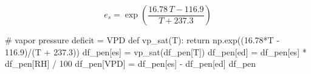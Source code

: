 \documentclass[
  letterpaper,
  DIV=11,
  numbers=noendperiod]{scrreprt}
\newenvironment{Shaded}{\begin{snugshade}}{\end{snugshade}}
\newcommand{\CommentTok}[1]{\textcolor[rgb]{0.37,0.37,0.37}{#1}}
\newcommand{\ControlFlowTok}[1]{\textcolor[rgb]{0.00,0.23,0.31}{#1}}
\newcommand{\DecValTok}[1]{\textcolor[rgb]{0.68,0.00,0.00}{#1}}
\newcommand{\FloatTok}[1]{\textcolor[rgb]{0.68,0.00,0.00}{#1}}
\newcommand{\KeywordTok}[1]{\textcolor[rgb]{0.00,0.23,0.31}{#1}}
\newcommand{\NormalTok}[1]{\textcolor[rgb]{0.00,0.23,0.31}{#1}}
\newcommand{\OperatorTok}[1]{\textcolor[rgb]{0.37,0.37,0.37}{#1}}
\newcommand{\StringTok}[1]{\textcolor[rgb]{0.13,0.47,0.30}{#1}}
\begin{document}
\[
e_s = \exp\left(\frac{16.78\,T-116.9}{T+237.3}\right)
\]

\begin{Shaded}
\begin{Highlighting}[]
\CommentTok{\# vapor pressure deficit = VPD}
\KeywordTok{def}\NormalTok{ vp\_sat(T):}
    \ControlFlowTok{return}\NormalTok{ np.exp((}\FloatTok{16.78}\OperatorTok{*}\NormalTok{T }\OperatorTok{{-}} \FloatTok{116.9}\NormalTok{)}\OperatorTok{/}\NormalTok{(T }\OperatorTok{+} \FloatTok{237.3}\NormalTok{)) }
\NormalTok{df\_pen[}\StringTok{\textquotesingle{}es\textquotesingle{}}\NormalTok{] }\OperatorTok{=}\NormalTok{ vp\_sat(df\_pen[}\StringTok{\textquotesingle{}T\textquotesingle{}}\NormalTok{])}
\NormalTok{df\_pen[}\StringTok{\textquotesingle{}ed\textquotesingle{}}\NormalTok{] }\OperatorTok{=}\NormalTok{ df\_pen[}\StringTok{\textquotesingle{}es\textquotesingle{}}\NormalTok{] }\OperatorTok{*}\NormalTok{ df\_pen[}\StringTok{\textquotesingle{}RH\textquotesingle{}}\NormalTok{] }\OperatorTok{/} \DecValTok{100}
\NormalTok{df\_pen[}\StringTok{\textquotesingle{}VPD\textquotesingle{}}\NormalTok{] }\OperatorTok{=}\NormalTok{ df\_pen[}\StringTok{\textquotesingle{}es\textquotesingle{}}\NormalTok{] }\OperatorTok{{-}}\NormalTok{ df\_pen[}\StringTok{\textquotesingle{}ed\textquotesingle{}}\NormalTok{]}
\NormalTok{df\_pen}
\end{Highlighting}
\end{Shaded}
\end{document}
